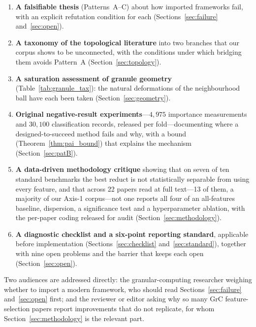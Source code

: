 \begin{enumerate}
  \item \textbf{A falsifiable thesis} (Patterns~A--C) about how imported
        frameworks fail, with an explicit refutation condition for each
        (Sections~\ref{sec:failure} and~\ref{sec:open}).
  \item \textbf{A taxonomy of the topological literature} into two
        branches that our corpus shows to be unconnected, with the
        conditions under which bridging them avoids Pattern~A
        (Section~\ref{sec:topology}).
  \item \textbf{A saturation assessment of granule geometry}
        (Table~\ref{tab:granule_tax}): the natural deformations of the
        neighbourhood ball have each been taken (Section~\ref{sec:geometry}).
  \item \textbf{Original negative-result experiments}---$4{,}975$
        importance measurements and $30{,}100$ classification records,
        released per fold---documenting where a designed-to-succeed method
        fails and why, with a bound (Theorem~\ref{thm:pai_bound}) that
        explains the mechanism (Section~\ref{sec:patB}).
  \item \textbf{A data-driven methodology critique} showing that on seven of
        ten standard benchmarks the best reduct is not statistically
        separable from using every feature, and that across 22 papers read at
        full text---13 of them, a majority of our Axis-1 corpus---not one
        reports all four of an all-features baseline, dispersion, a
        significance test and a hyperparameter ablation, with the per-paper
        coding released for audit (Section~\ref{sec:methodology}).
  \item \textbf{A diagnostic checklist and a six-point reporting standard},
        applicable before implementation (Sections~\ref{sec:checklist}
        and~\ref{sec:standard}), together with nine open problems and the
        barrier that keeps each open (Section~\ref{sec:open}).
\end{enumerate}

Two audiences are addressed directly: the granular-computing researcher
weighing whether to import a modern framework, who should read
Sections~\ref{sec:failure} and~\ref{sec:open} first; and the reviewer or
editor asking why so many GrC feature-selection papers report improvements
that do not replicate, for whom Section~\ref{sec:methodology} is the
relevant part.

